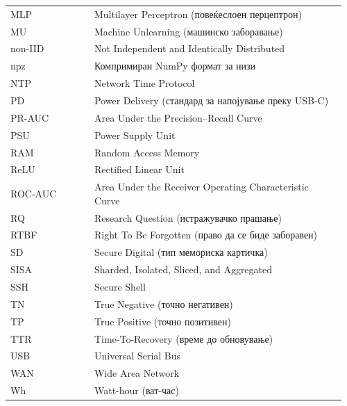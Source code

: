 \begin{longtable}{p{0.24\linewidth} >{\raggedright\arraybackslash}p{0.72\linewidth}}
MLP & Multilayer Perceptron (повеќеслоен перцептрон) \\
MU & Machine Unlearning (машинско заборавање) \\
non-IID & Not Independent and Identically Distributed \\
npz & Компримиран NumPy формат за низи \\
NTP & Network Time Protocol \\
PD & Power Delivery (стандард за напојување преку USB-C) \\
PR-AUC & Area Under the Precision--Recall Curve \\
PSU & Power Supply Unit \\
RAM & Random Access Memory \\
ReLU & Rectified Linear Unit \\
ROC-AUC & Area Under the Receiver Operating Characteristic Curve \\
RQ & Research Question (истражувачко прашање) \\
RTBF & Right To Be Forgotten (право да се биде заборавен) \\
SD & Secure Digital (тип мемориска картичка) \\
SISA & Sharded, Isolated, Sliced, and Aggregated \\
SSH & Secure Shell \\
TN & True Negative (точно негативен) \\
TP & True Positive (точно позитивен) \\
TTR & Time-To-Recovery (време до обновување) \\
USB & Universal Serial Bus \\
WAN & Wide Area Network \\
Wh & Watt-hour (ват-час) \\
\end{longtable}
\par
\endgroup
